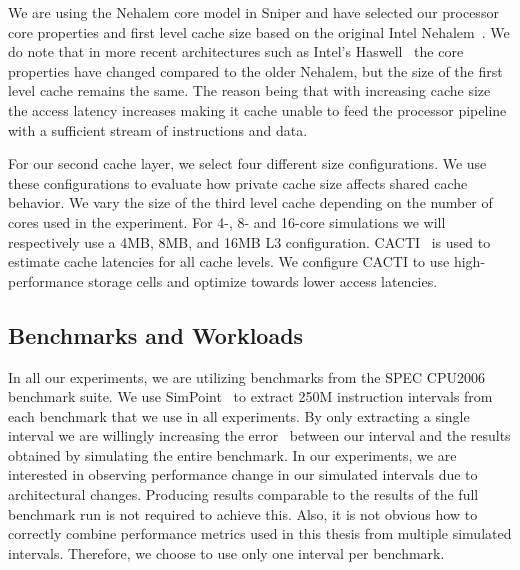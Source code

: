 We are using the Nehalem core model in Sniper and have selected our processor core properties and first level cache size based on the original Intel Nehalem~\cite{Thomadakis2011}. 
We do note that in more recent architectures such as Intel's Haswell~\cite{Jain2013} the core properties have changed compared to the older Nehalem, but the size of the first level cache remains the same.
The reason being that with increasing cache size the access latency increases making it cache unable to feed the processor pipeline with a sufficient stream of instructions and data.

For our second cache layer, we select four different size configurations.
We use these configurations to evaluate how private cache size affects shared cache behavior.
We vary the size of the third level cache depending on the number of cores used in the experiment.
For 4-, 8- and 16-core simulations we will respectively use a 4MB, 8MB, and 16MB L3 configuration.
CACTI~\cite{Shivakumar2001} is used to estimate cache latencies for all cache levels.
We configure CACTI to use high-performance storage cells and optimize towards lower access latencies.


\subsection{Benchmarks and Workloads}
\label{sec:methodology:benchmarks}
In all our experiments, we are utilizing benchmarks from the SPEC CPU2006~\cite{SPECCPU2006} benchmark suite. 
We use SimPoint~\cite{Hamerly2005} to extract 250M instruction intervals from each benchmark that we use in all experiments.
By only extracting a single interval we are willingly increasing the error~\cite{Hamerly2004} between our interval and the results obtained by simulating the entire benchmark.
In our experiments, we are interested in observing performance change in our simulated intervals due to architectural changes.
Producing results comparable to the results of the full benchmark run is not required to achieve this.
Also, it is not obvious how to correctly combine performance metrics used in this thesis from multiple simulated intervals.
Therefore, we choose to use only one interval per benchmark.


